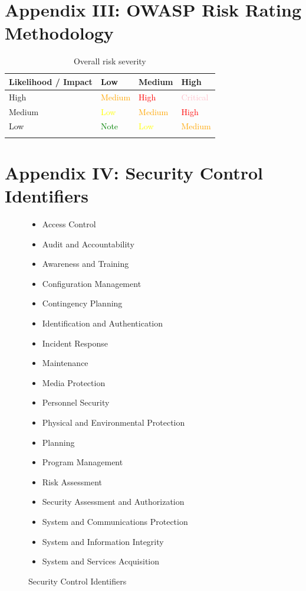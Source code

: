 \documentclass{article}
\begin{document}
\newpage
\section{Appendix III: OWASP Risk Rating Methodology}
\begin{table}[h]\begin{center}
    \begin{tabularx}{\linewidth}{ X | X | X | X }
        Likelihood / Impact & Low & Medium & High \\ \hline
        High & \textcolor{orange}{Medium} & \textcolor{red}{High} & \textcolor{pink}{Critical} \\
        Medium & \textcolor{yellow}{Low} & \textcolor{orange}{Medium} & \textcolor{red}{High} \\
        Low & \textcolor{green}{Note} & \textcolor{yellow}{Low} & \textcolor{orange}{Medium} \\
    \caption{Overall risk severity \citep{open_web_application_security_project_owasp_2016}}
    \end{tabularx}
    \label{open_web_application_security_project_owasp_2016}
\end{center}\end{table}

\newpage
\section{Appendix IV: Security Control Identifiers}
\begin{figure}[h]
    \begin{itemize}
        \item{Access Control}
	\item{Audit and Accountability}
	\item{Awareness and Training}
	\item{Configuration Management}
	\item{Contingency Planning}
	\item{Identification and Authentication}
	\item{Incident Response}
	\item{Maintenance}
	\item{Media Protection}
	\item{Personnel Security}
	\item{Physical and Environmental Protection}
	\item{Planning}
	\item{Program Management}
	\item{Risk Assessment}
	\item{Security Assessment and Authorization}
	\item{System and Communications Protection}
	\item{System and Information Integrity}
	\item{System and Services Acquisition}
    \end{itemize}
    \caption{Security Control Identifiers \citep{national_institute_of_standards_and_technology_nist_2013}}
    \label{enumerate:national_institute_of_standards_and_technology_nist_2013}
\end{figure}
\end{document}
